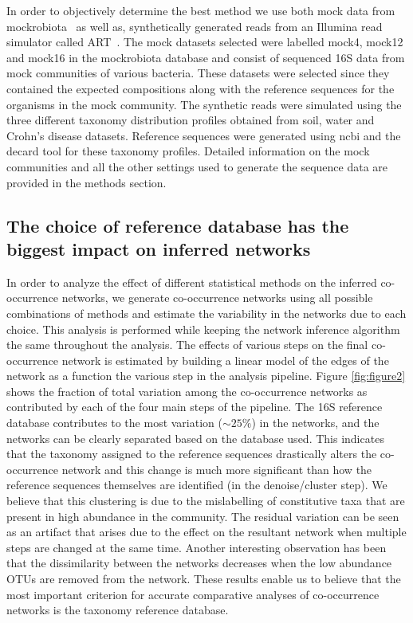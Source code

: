   In order to objectively determine the best method we use both mock data from mockrobiota~\cite{Bokulich2016} as well as, synthetically generated reads from an Illumina read simulator called ART~\cite{Huang2012}.
  The mock datasets selected were labelled mock4, mock12 and mock16 in the mockrobiota database and consist of sequenced 16S data from mock communities of various bacteria.
  These datasets were selected since they contained the expected compositions along with the reference sequences for the organisms in the mock community.
  The synthetic reads were simulated using the three different taxonomy distribution profiles obtained from soil, water and Crohn's disease datasets.
  Reference sequences were generated using \ac{ncbi} and the decard tool \cite{Golob2017} for these taxonomy profiles.
  Detailed information on the mock communities and all the other settings used to generate the sequence data are provided in the methods section.


  \FloatBarrier

  \subsection*{The choice of reference database has the biggest impact on inferred networks}

  In order to analyze the effect of different statistical methods on the inferred co-occurrence networks, we generate co-occurrence networks using all possible combinations of methods and estimate the variability in the networks due to each choice.
  This analysis is performed while keeping the network inference algorithm the same throughout the analysis.
  The effects of various steps on the final co-occurrence network is estimated by building a linear model of the edges of the network as a function the various step in the analysis pipeline.
  Figure \ref{fig:figure2} shows the fraction of total variation among the co-occurrence networks as contributed by each of the four main steps of the pipeline.
  The 16S reference database contributes to the most variation ($\sim25\%$) in the networks, and the networks can be clearly separated based on the database used.
  This indicates that the taxonomy assigned to the reference sequences drastically alters the co-occurrence network and this change is much more significant than how the reference sequences themselves are identified (in the denoise/cluster step).
  We believe that this clustering is due to the mislabelling of constitutive taxa that are present in high abundance in the community.
  The residual variation can be seen as an artifact that arises due to the effect on the resultant network when multiple steps are changed at the same time.
  Another interesting observation has been that the dissimilarity between the networks decreases when the low abundance OTUs are removed from the network.
  These results enable us to believe that the most important criterion for accurate comparative analyses of co-occurrence networks is the taxonomy reference database.

